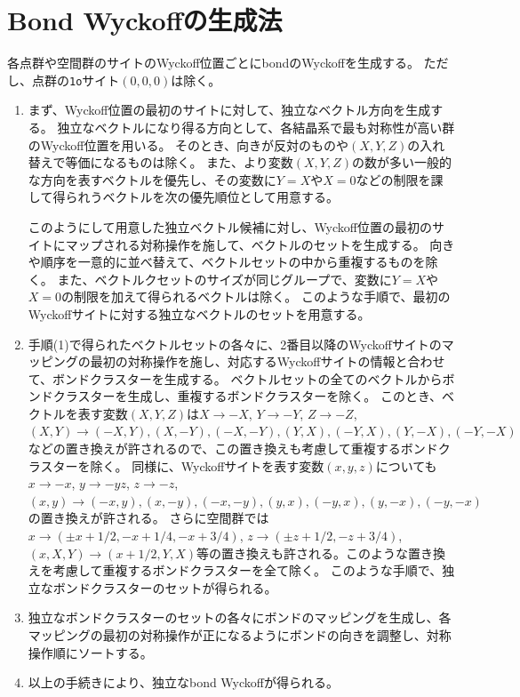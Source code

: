 \documentclass[11pt]{easymemo}
\begin{document}
\section{Bond Wyckoffの生成法}

各点群や空間群のサイトのWyckoff位置ごとにbondのWyckoffを生成する。
ただし、点群の{\tt 1o}サイト$(0,0,0)$は除く。
\begin{enumerate}[(1)]
\item
まず、Wyckoff位置の最初のサイトに対して、独立なベクトル方向を生成する。
独立なベクトルになり得る方向として、各結晶系で最も対称性が高い群のWyckoff位置を用いる。
そのとき、向きが反対のものや$(X,Y,Z)$の入れ替えで等価になるものは除く。
また、より変数$(X,Y,Z)$の数が多い一般的な方向を表すベクトルを優先し、その変数に$Y=X$や$X=0$などの制限を課して得られうベクトルを次の優先順位として用意する。

このようにして用意した独立ベクトル候補に対し、Wyckoff位置の最初のサイトにマップされる対称操作を施して、ベクトルのセットを生成する。
向きや順序を一意的に並べ替えて、ベクトルセットの中から重複するものを除く。
また、ベクトルクセットのサイズが同じグループで、変数に$Y=X$や$X=0$の制限を加えて得られるベクトルは除く。
このような手順で、最初のWyckoffサイトに対する独立なベクトルのセットを用意する。

\item 手順(1)で得られたベクトルセットの各々に、2番目以降のWyckoffサイトのマッピングの最初の対称操作を施し、対応するWyckoffサイトの情報と合わせて、ボンドクラスターを生成する。
ベクトルセットの全てのベクトルからボンドクラスターを生成し、重複するボンドクラスターを除く。
このとき、ベクトルを表す変数$(X,Y,Z)$は$X\to -X$, $Y\to -Y$, $Z\to -Z$, $(X,Y)\to (-X,Y),(X,-Y),(-X,-Y),(Y,X),(-Y,X),(Y,-X),(-Y,-X)$などの置き換えが許されるので、この置き換えも考慮して重複するボンドクラスターを除く。
同様に、Wyckoffサイトを表す変数$(x,y,z)$についても$x\to -x$, $y\to -yz$, $z\to -z$, $(x,y)\to(-x,y),(x,-y),(-x,-y),(y,x),(-y,x),(y,-x),(-y,-x)$の置き換えが許される。
さらに空間群では$x\to(\pm x+1/2,-x+1/4,-x+3/4)$, $z\to(\pm z+1/2,-z+3/4)$, $(x,X,Y)\to(x+1/2,Y,X)$等の置き換えも許される。このような置き換えを考慮して重複するボンドクラスターを全て除く。
このような手順で、独立なボンドクラスターのセットが得られる。

\item 独立なボンドクラスターのセットの各々にボンドのマッピングを生成し、各マッピングの最初の対称操作が正になるようにボンドの向きを調整し、対称操作順にソートする。

\item 以上の手続きにより、独立なbond Wyckoffが得られる。
\end{enumerate}
\end{document}
